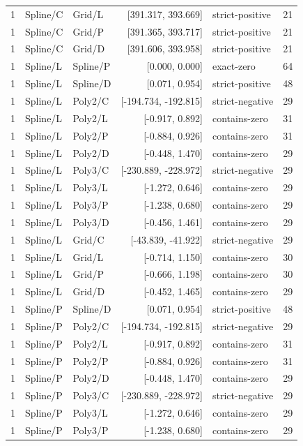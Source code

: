 \begin{longtable}{lllrlr}
1 & Spline/C & Grid/L & [391.317, 393.669] & strict-positive & 21 \\
1 & Spline/C & Grid/P & [391.365, 393.717] & strict-positive & 21 \\
1 & Spline/C & Grid/D & [391.606, 393.958] & strict-positive & 21 \\
1 & Spline/L & Spline/P & [0.000, 0.000] & exact-zero & 64 \\
1 & Spline/L & Spline/D & [0.071, 0.954] & strict-positive & 48 \\
1 & Spline/L & Poly2/C & [-194.734, -192.815] & strict-negative & 29 \\
1 & Spline/L & Poly2/L & [-0.917, 0.892] & contains-zero & 31 \\
1 & Spline/L & Poly2/P & [-0.884, 0.926] & contains-zero & 31 \\
1 & Spline/L & Poly2/D & [-0.448, 1.470] & contains-zero & 29 \\
1 & Spline/L & Poly3/C & [-230.889, -228.972] & strict-negative & 29 \\
1 & Spline/L & Poly3/L & [-1.272, 0.646] & contains-zero & 29 \\
1 & Spline/L & Poly3/P & [-1.238, 0.680] & contains-zero & 29 \\
1 & Spline/L & Poly3/D & [-0.456, 1.461] & contains-zero & 29 \\
1 & Spline/L & Grid/C & [-43.839, -41.922] & strict-negative & 29 \\
1 & Spline/L & Grid/L & [-0.714, 1.150] & contains-zero & 30 \\
1 & Spline/L & Grid/P & [-0.666, 1.198] & contains-zero & 30 \\
1 & Spline/L & Grid/D & [-0.452, 1.465] & contains-zero & 29 \\
1 & Spline/P & Spline/D & [0.071, 0.954] & strict-positive & 48 \\
1 & Spline/P & Poly2/C & [-194.734, -192.815] & strict-negative & 29 \\
1 & Spline/P & Poly2/L & [-0.917, 0.892] & contains-zero & 31 \\
1 & Spline/P & Poly2/P & [-0.884, 0.926] & contains-zero & 31 \\
1 & Spline/P & Poly2/D & [-0.448, 1.470] & contains-zero & 29 \\
1 & Spline/P & Poly3/C & [-230.889, -228.972] & strict-negative & 29 \\
1 & Spline/P & Poly3/L & [-1.272, 0.646] & contains-zero & 29 \\
1 & Spline/P & Poly3/P & [-1.238, 0.680] & contains-zero & 29 \\

\end{longtable}
